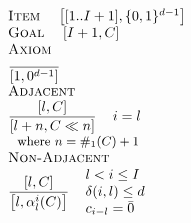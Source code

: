 
\newcommand{\wldadjcond}{
\begin{array}{l }
i = l\\
\end{array}
}

\newcommand{\wldnonadjcond}{
\begin{array}{l }
l < i \leq I \\
\delta(i, l) \leq d \\
c_{i-l} = \bzero \\
\end{array}
}


\begin{math} %
 \left. 
  \begin{array}{l}
    \textsc{Item} ~~~~ {\itembrack{[1 .. I +1], \{0,1\}^{d-1}}} \\
    \textsc{Goal} ~~~~ {\itembrack{I+1, C}} \\
    \textsc{Axiom} \\ 
	\drule{}{\itembrack{1, 0^{d-1}}}{} \\
    \textsc{Adjacent} \\ 
	\drule{\itembrack{l, C}}{\itembrack{l + n, C \ll n}}{\wldadjcond} \\ 
	~~ \text{\small where $n = \#_1(C) + 1$} \\
    \textsc{Non-Adjacent} \\ 
	\drule{\itembrack{l, C}}{\itembrack{l, \alpha_l^{i}(C)}}{\wldnonadjcond} \\ 
	
  \end{array} 
\right.
\end{math}

